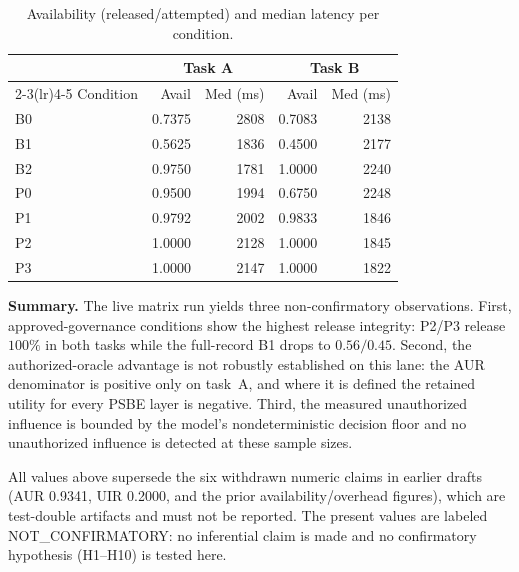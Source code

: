 \begin{table}[t]
\centering
\caption{Availability (released/attempted) and median latency per condition.}
\label{tab:matrix_availability}
\small
\begin{tabular}{lrr|rr}
\toprule
& \multicolumn{2}{c}{Task A} & \multicolumn{2}{c}{Task B} \\
\cmidrule(lr){2-3}\cmidrule(lr){4-5}
Condition & Avail & Med (ms) & Avail & Med (ms) \\
\midrule
B0 & 0.7375 & 2808 & 0.7083 & 2138 \\
B1 & 0.5625 & 1836 & 0.4500 & 2177 \\
B2 & 0.9750 & 1781 & 1.0000 & 2240 \\
P0 & 0.9500 & 1994 & 0.6750 & 2248 \\
P1 & 0.9792 & 2002 & 0.9833 & 1846 \\
P2 & 1.0000 & 2128 & 1.0000 & 1845 \\
P3 & 1.0000 & 2147 & 1.0000 & 1822 \\
\bottomrule
\end{tabular}
\end{table}

\noindent \textbf{Summary.} The live matrix run yields three non-confirmatory
observations. First, approved-governance conditions show the highest release
integrity: P2/P3 release \(100\%\) in both tasks while the full-record B1 drops to
\(0.56/0.45\). Second, the authorized-oracle advantage is not robustly
established on this lane: the AUR denominator is positive only on task~A, and
where it is defined the retained utility for every PSBE layer is negative. Third,
the measured unauthorized influence is bounded by the model's nondeterministic
decision floor and no unauthorized influence is detected at these sample sizes.

All values above supersede the six withdrawn numeric claims in earlier drafts
(AUR 0.9341, UIR 0.2000, and the prior availability/overhead figures), which are
test-double artifacts and must not be reported. The present values are labeled
NOT\_CONFIRMATORY: no inferential claim is made and no confirmatory hypothesis
(H1--H10) is tested here.